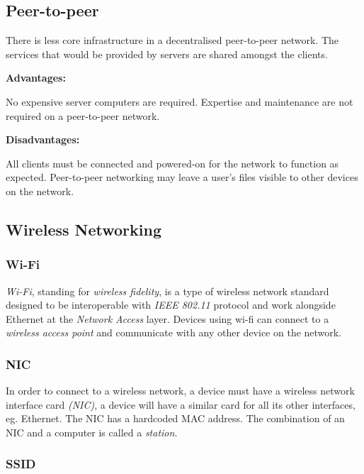 \documentclass[9pt]{article}
\begin{document}
\subsection{Peer-to-peer}
\label{sec:org33d9168}

There is less core infrastructure in a decentralised peer-to-peer network. The services that would be provided by servers are shared amongst the clients.

\textbf{Advantages:}

No expensive server computers are required. Expertise and maintenance are not required on a peer-to-peer network.

\textbf{Disadvantages:}

All clients must be connected and powered-on for the network to function as expected. Peer-to-peer networking may leave a user's files visible to other devices on the network.

\subsection{Wireless Networking}
\label{sec:org8fa2a8d}
\subsubsection{Wi-Fi}
\label{sec:org63f348f}

\emph{Wi-Fi}, standing for \emph{wireless fidelity}, is a type of wireless network standard designed to be interoperable with \emph{IEEE 802.11} protocol and work alongside Ethernet at the \emph{Network Access} layer. Devices using wi-fi can connect to a \emph{wireless access point} and communicate with any other device on the network.

\subsubsection{NIC}
\label{sec:orga166b1d}

In order to connect to a wireless network, a device must have a wireless network interface card \emph{(NIC)}, a device will have a similar card for all its other interfaces, eg. Ethernet. The NIC has a hardcoded MAC address. The combination of an NIC and a computer is called a \emph{station}.

\subsubsection{SSID}
\label{sec:org272c489}
\end{document}
